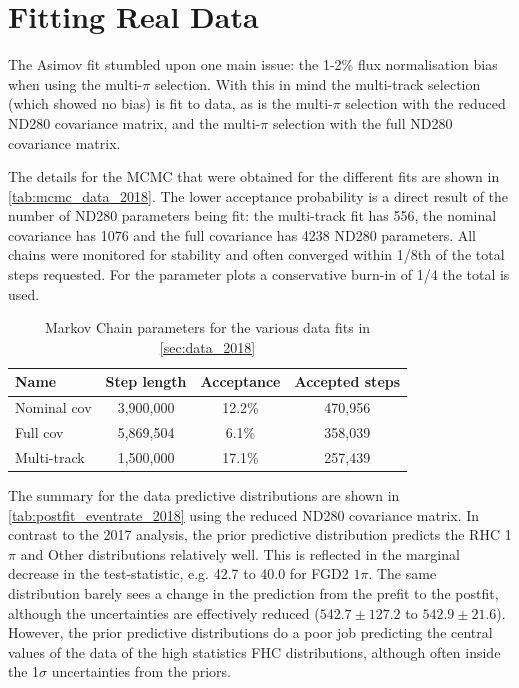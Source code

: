 \section{Fitting Real Data}
\label{sec:data_2018}
The Asimov fit stumbled upon one main issue: the 1-2\% flux normalisation bias when using the multi-$\pi$ selection. With this in mind the multi-track selection (which showed no bias) is fit to data, as is the multi-$\pi$ selection with the reduced ND280 covariance matrix, and the multi-$\pi$ selection with the full ND280 covariance matrix.

The details for the MCMC that were obtained for the different fits are shown in \autoref{tab:mcmc_data_2018}. The lower acceptance probability is a direct result of the number of ND280 parameters being fit: the multi-track fit has 556, the nominal covariance has 1076 and the full covariance has 4238 ND280 parameters. All chains were monitored for stability and often converged within 1/8th of the total steps requested. For the parameter plots a conservative burn-in of 1/4 the total is used.
\begin{table}[h]
	\begin{tabular}{l | c c c}
		\hline
		\hline
		Name		&	Step length & Acceptance & Accepted steps \\
		\hline
		Nominal cov	& 	3,900,000	& 12.2\%	 & 470,956 \\
		Full cov	& 	5,869,504	& 6.1\%		 & 358,039 \\
		Multi-track & 	1,500,000	& 17.1\%	 & 257,439 \\
		\hline
		\hline
	\end{tabular}
	\caption{Markov Chain parameters for the various data fits in \autoref{sec:data_2018}}
	\label{tab:mcmc_data_2018}
\end{table}

The summary for the data predictive distributions are shown in \autoref{tab:postfit_eventrate_2018} using the reduced ND280 covariance matrix. In contrast to the 2017 analysis, the prior predictive distribution predicts the RHC 1$\pi$ and Other distributions relatively well. This is reflected in the marginal decrease in the test-statistic, e.g. 42.7 to 40.0 for FGD2 \numubar $1\pi$. The same distribution barely sees a change in the prediction from the prefit to the postfit, although the uncertainties are effectively reduced ($542.7\pm127.2$ to $542.9\pm21.6$). However, the prior predictive distributions do a poor job predicting the central values of the data of the high statistics FHC distributions, although often inside the 1$\sigma$ uncertainties from the priors.

